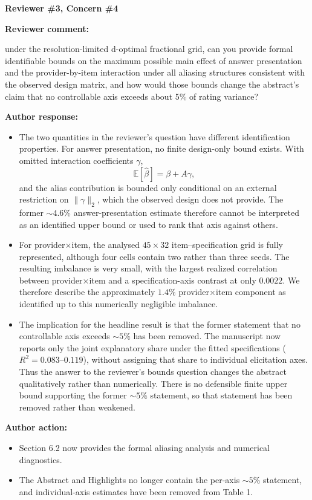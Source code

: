 \documentclass[11pt]{article}
\newcommand{\rvcomment}[1]{{\color{ReviewerGreen}#1}}
\newcommand{\concern}[1]{\textbf{\color{ReviewerGreen}#1}}
\begin{document}
\vspace{4pt}

\concern{Reviewer \#3, Concern \#4}

\concern{Reviewer comment:}

\rvcomment{under the resolution-limited d-optimal fractional grid, can you provide formal
identifiable bounds on the maximum possible main effect of answer presentation and the
provider-by-item interaction under all aliasing structures consistent with the observed design
matrix, and how would those bounds change the abstract's claim that no controllable axis exceeds
about 5\% of rating variance?}

\textbf{Author response:}

\begin{itemize}
\item The two quantities in the reviewer's question have different identification properties. For answer
presentation, no finite design-only bound exists. With omitted interaction coefficients $\gamma$,
\[
\mathbb{E}[\hat{\beta}]=\beta+A\gamma,
\]
and the alias contribution is bounded only conditional on an external restriction on
$\lVert\gamma\rVert_2$, which the observed design does not provide. The former ${\sim}4.6\%$
answer-presentation estimate therefore cannot be interpreted as an identified upper bound or used
to rank that axis against others.
\item For provider$\times$item, the analysed $45\times32$ item--specification grid is fully represented,
although four cells contain two rather than three seeds. The resulting imbalance is very small, with the largest realized
correlation between provider$\times$item and a specification-axis contrast at only $0.0022$. We therefore describe the approximately $1.4\%$ provider$\times$item component as
identified up to this numerically negligible imbalance.
\item The implication for the headline result is that the former statement that no controllable axis
exceeds ${\sim}5\%$ has been removed. The manuscript now reports only the joint explanatory share
under the fitted specifications ($R^2=0.083$--$0.119$), without assigning that share to individual
elicitation axes. Thus the answer to the reviewer's bounds question changes the abstract
qualitatively rather than numerically. There is no defensible finite upper bound supporting the
former ${\sim}5\%$ statement, so that statement has been removed rather than weakened.
\end{itemize}

\textbf{Author action:}

\begin{itemize}
\item Section 6.2 now provides the formal aliasing analysis and numerical diagnostics.
\item The Abstract and Highlights no longer contain the per-axis ${\sim}5\%$ statement, and individual-axis estimates have been removed from Table 1.
\end{itemize}

\vspace{4pt}
\end{document}
